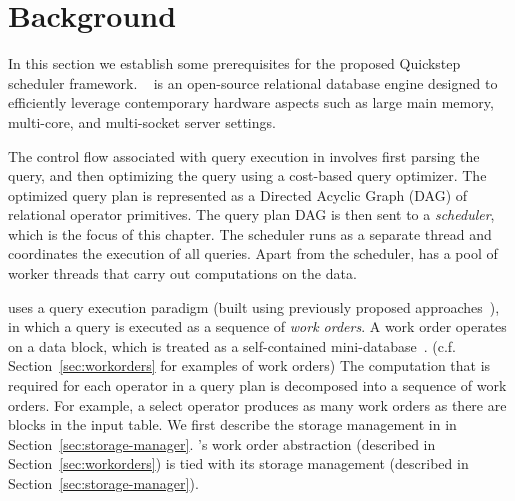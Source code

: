 \section{Background}\label{sec:background}
In this section we establish some prerequisites for the proposed Quickstep scheduler framework.
\sys{}~\cite{quickstep-vldb} is an open-source relational database engine 
designed to efficiently leverage contemporary hardware aspects such as large main memory, multi-core, and multi-socket server settings. 

The control flow associated with query execution in \sys{} involves first parsing the query, and then optimizing the query using a cost-based query optimizer.
The optimized query plan is represented as a Directed Acyclic Graph (DAG) of relational operator primitives. 
The query plan DAG is then sent to a \textit{scheduler}, which is the focus of this chapter. 
The scheduler runs as a separate thread and coordinates the execution of all queries. 
Apart from the scheduler, \sys{} has a pool of worker threads that carry out computations on the data. 

\sys{} uses a query execution paradigm (built using previously proposed approaches~\cite{qsstorage,morsel}), in which a query is executed as a sequence of \textit{work orders}. 
A work order operates on a data block, which is treated as a self-contained mini-database~\cite{qsstorage}.  (c.f. Section~\ref{sec:workorders} for examples of work orders)
The computation that is required for each operator in a query plan is decomposed into a sequence of work orders. 
For example, a select operator produces as many work orders as there are blocks in the input table. 
We first describe the storage management in \sys{} in Section~\ref{sec:storage-manager}.
\sys{}'s work order abstraction (described in Section~\ref{sec:workorders}) is tied with its storage management (described in Section~\ref{sec:storage-manager}).

